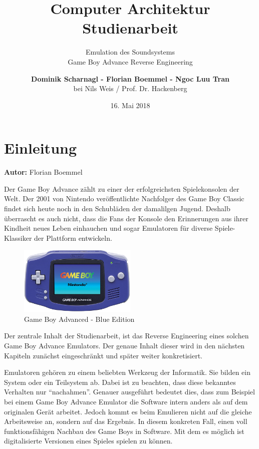 \documentclass[11pt,a4paper]{scrartcl}
\title{\vspace{5cm}\huge Computer Architektur \\ \Large Studienarbeit \vspace{1cm}}
\subtitle{\Huge Emulation des Soundsystems \\ \Large Game Boy Advance Reverse Engineering \vspace{1cm}}
\author{\large \textbf{Dominik Scharnagl - Florian Boemmel - Ngoc Luu Tran}\\ \normalsize bei Nils Weis / Prof. Dr. Hackenberg}
\date{\normalsize 16. Mai 2018}
\newcommand{\AutorFlorian} {
    \vspace{-4mm}
    \large \textbf{Autor:} Florian Boemmel \normalsize
    \vspace{2mm}
}
\begin{document}
\sffamily

\maketitle
\thispagestyle{empty}
\clearpage

\setcounter{page}{1}


\tableofcontents
\clearpage
{}


\printindex
\clearpage


\section{Einleitung} \label{Einleitung}
\AutorFlorian

Der Game Boy Advance z\"ahlt zu einer der erfolgreichsten Spielekonsolen der Welt. Der 2001 von Nintendo \cite{NintendoGeschichte} ver\"offentlichte Nachfolger des Game Boy Classic findet sich heute noch in den Schubl\"aden der damalilgen Jugend. Deshalb \"uberrascht es auch nicht, dass die Fans der Konsole den Erinnerungen aus ihrer Kindheit neues Leben einhauchen und sogar Emulatoren f\"ur diverse Spiele-Klassiker der Plattform entwickeln.

\begin{figure}[h]
    \centering
    \includegraphics[width=0.5\textwidth]{GameBoyAdvance}
    \caption{Game Boy Advanced - Blue Edition}
    \label{fig:gba}
\end{figure}

Der zentrale Inhalt der Studienarbeit, ist das Reverse Engineering eines solchen Game Boy Advance Emulators. Der genaue Inhalt dieser wird in den n\"achsten Kapiteln zun\"achst eingeschr\"ankt und sp\"ater weiter konkretisiert.

Emulatoren geh\"oren zu einem beliebten Werkzeug der Informatik. Sie bilden ein System oder ein Teilsystem ab. Dabei ist zu beachten, dass diese bekanntes Verhalten nur \enquote{nachahmen}. Genauer ausgef\"uhrt bedeutet dies, dass zum Beispiel bei einem Game Boy Advance Emulator die Software intern anders als auf dem originalen Ger\"at arbeitet. Jedoch kommt es beim Emulieren nicht auf die gleiche Arbeitsweise an, sondern auf das Ergebnis. In diesem konkreten Fall, einen voll funktionsf\"ahigen Nachbau des Game Boys in Software. Mit dem es m\"oglich ist digitalisierte Versionen eines Spieles spielen zu k\"onnen.\newline
\end{document}
